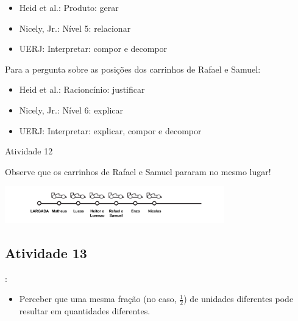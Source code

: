 \begin{multicols}{2}
  \vspace{.1cm}

 \vspace{.1cm}
\begin{itemize} %
    \item       Heid et al.: Produto: gerar
    \item       Nicely, Jr.: Nível 5: relacionar
    \item       UERJ: Interpretar: compor e decompor
\end{itemize} %


  Para a pergunta sobre as posições dos carrinhos de Rafael e Samuel:
\begin{itemize} %
    \item       Heid et al.: Racioncínio: justificar
    \item       Nicely, Jr.: Nível 6: explicar
    \item       UERJ: Interpretar: explicar, compor e decompor
\end{itemize} %


\begin{resposta*}{Atividade 12}

Observe que os carrinhos de Rafael e Samuel pararam no mesmo lugar!

\hspace{-15mm} \includegraphics[width=95mm, keepaspectratio]{../figuras/licao02/ativ12_resposta.png}

\end{resposta*}

\newpage

\subsection{Atividade 13}





  \vspace{.1cm}:

  \begin{itemize} %
    \item       Perceber que uma mesma fração (no caso, $\frac{1}{2}$) de unidades diferentes pode resultar em quantidades diferentes.
\end{itemize} %



\end{multicols}
